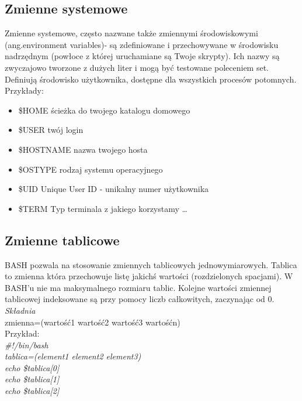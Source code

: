 \documentclass[a4paper,11pt]{article}
\begin{document}
\subsection{Zmienne systemowe}
Zmienne systemowe, często nazwane także zmiennymi środowiskowymi (ang.environment variables)- są zdefiniowane i przechowywane w środowisku nadrzędnym (powłoce z której uruchamiane są Twoje skrypty). Ich nazwy są zwyczajowo tworzone z dużych liter i mogą być testowane poleceniem set. Definiują środowisko użytkownika, dostępne dla wszystkich procesów potomnych. \cite{p} \\
Przykłady:
\begin{itemize}
 \item \$HOME ścieżka do twojego katalogu domowego
 \item \$USER twój login 
 \item \$HOSTNAME nazwa twojego hosta
 \item \$OSTYPE rodzaj systemu operacyjnego
 \item \$UID Unique User ID - unikalny numer użytkownika
 \item \$TERM Typ terminala z jakiego korzystamy \ldots
\end{itemize}
 
\subsection{Zmienne tablicowe}
BASH pozwala na stosowanie zmiennych tablicowych jednowymiarowych.
Tablica to zmienna która przechowuje listę jakichś wartości (rozdzielonych
spacjami). W BASH'u nie ma maksymalnego rozmiaru tablic. Kolejne wartości zmiennej tablicowej indeksowane są przy pomocy liczb całkowitych, zaczynając od 0. \cite{s}\\
\textit{Składnia} \\
zmienna=(wartość1 wartość2 wartość3 wartośćn) \\
Przykład:  \\
\textit{ \#!/bin/bash \\
tablica=(element1 element2 element3)\\
echo \${tablica[0]}\\
echo \${tablica[1]}\\
echo \${tablica[2]}\\ }
\end{document}
